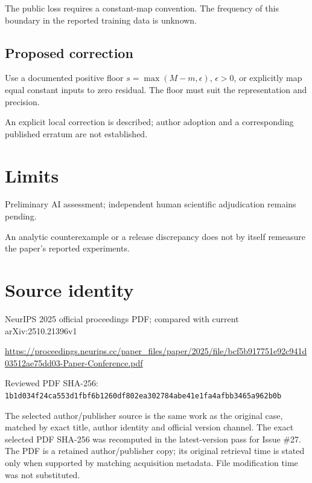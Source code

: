 \documentclass[11pt]{article}
\begin{document}
The public loss requires a constant-map convention. The frequency of this boundary in the reported training data is unknown.

\subsection*{Proposed correction}

Use a documented positive floor \(s=\max(M-m,\epsilon)\), \(\epsilon>0\), or explicitly map equal constant inputs to zero residual. The floor must suit the representation and precision.

An explicit local correction is described; author adoption and a corresponding published erratum are not established.

\section*{Limits}

Preliminary AI assessment; independent human scientific adjudication remains pending.\par

An analytic counterexample or a release discrepancy does not by itself remeasure the paper’s reported experiments.\par

\section*{Source identity}

NeurIPS 2025 official proceedings PDF; compared with current arXiv:2510.21396v1

\url{https://proceedings.neurips.cc/paper_files/paper/2025/file/bcf5b917751e92c941d03512ae75dd03-Paper-Conference.pdf}

Reviewed PDF SHA-256: \nolinkurl{1b1d034f24ca553d1fbf6b1260df802ea302784abe41e1fa4afbb3465a962b0b}

The selected author/publisher source is the same work as the original case, matched by exact title, author identity and official version channel. The exact selected PDF SHA-256 was recomputed in the latest-version pass for Issue \#27. The PDF is a retained author/publisher copy; its original retrieval time is stated only when supported by matching acquisition metadata. File modification time was not substituted.
\end{document}

